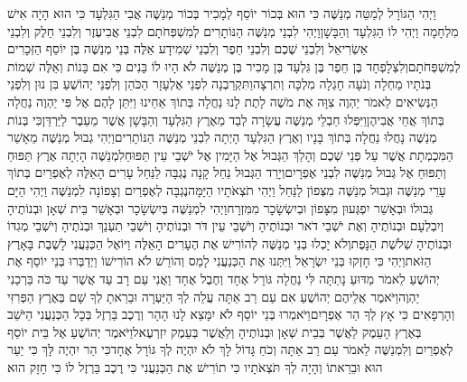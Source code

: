 \documentclass[../main/main.tex]{subfiles}
\begin{document}
\begin{multicols*}{\ncols}
וַיְהִי הַגּוֹרָל לְמַטֵּה מְנַשֶּׁה כִּי הוּא בְּכוֹר יוֹסֵף לְמָכִיר בְּכוֹר מְנַשֶּׁה אֲבִי הַגִּלְעָד כִּי הוּא הָיָה אִישׁ מִלְחָמָה וַיְהִי לוֹ הַגִּלְעָד וְהַבָּשָׁן\PreVerseSpace{}וַיְהִי לִבְנֵי מְנַשֶּׁה הַנּוֹתָרִים לְמִשְׁפְּחֹתָם לִבְנֵי אֲבִיעֶזֶר וְלִבְנֵי חֵלֶק וְלִבְנֵי אַשְׂרִיאֵל וְלִבְנֵי שֶׁכֶם וְלִבְנֵי חֵפֶר וְלִבְנֵי שְׁמִידָע אֵלֶּה בְּנֵי מְנַשֶּׁה בֶּן יוֹסֵף הַזְּכָרִים לְמִשְׁפְּחֹתָם\PreVerseSpace{}וְלִצְלָפְחָד בֶּן חֵפֶר בֶּן גִּלְעָד בֶּן מָכִיר בֶּן מְנַשֶּׁה לֹא הָיוּ לוֹ בָּנִים כִּי אִם בָּנוֹת וְאֵלֶּה שְׁמוֹת בְּנֹתָיו מַחְלָה וְנֹעָה חָגְלָה מִלְכָּה וְתִרְצָה\PreVerseSpace{}וַתִּקְרַבְנָה לִפְנֵי אֶלְעָזָר הַכֹּהֵן וְלִפְנֵי יְהוֹשֻׁעַ בִּן נוּן וְלִפְנֵי הַנְּשִׂיאִים לֵאמֹר יַהְוֶה צִוָּה אֶת מֹשֶׁה לָתֶת לָנוּ נַחֲלָה בְּתוֹךְ אַחֵינוּ וַיִּתֵּן לָהֶם אֶל פִּי יַהְוֶה נַחֲלָה בְּתוֹךְ אֲחֵי אֲבִיהֶן\PreVerseSpace{}וַיִּפְּלוּ חַבְלֵי מְנַשֶּׁה עֲשָׂרָה לְבַד מֵאֶרֶץ הַגִּלְעָד וְהַבָּשָׁן אֲשֶׁר מֵעֵבֶר לַיַּרְדֵּן\PreVerseSpace{}כִּי בְּנוֹת מְנַשֶּׁה נָחֲלוּ נַחֲלָה בְּתוֹךְ בָּנָיו וְאֶרֶץ הַגִּלְעָד הָיְתָה לִבְנֵי מְנַשֶּׁה הַנּוֹתָרִים\PreVerseSpace{}וַיְהִי גְבוּל מְנַשֶּׁה מֵאָשֵׁר הַמִּכְמְתָת אֲשֶׁר עַל פְּנֵי שְׁכֶם וְהָלַךְ הַגְּבוּל אֶל הַיָּמִין אֶל יֹשְׁבֵי עֵין תַּפּוּחַ\PreVerseSpace{}לִמְנַשֶּׁה הָיְתָה אֶרֶץ תַּפּוּחַ וְתַפּוּחַ אֶל גְּבוּל מְנַשֶּׁה לִבְנֵי אֶפְרָיִם\PreVerseSpace{}וְיָרַד הַגְּבוּל נַחַל קָנָה נֶגְבָּה לַנַּחַל עָרִים הָאֵלֶּה לְאֶפְרַיִם בְּתוֹךְ עָרֵי מְנַשֶּׁה וּגְבוּל מְנַשֶּׁה מִצְּפוֹן לַנַּחַל וַיְהִי תֹצְאֹתָיו הַיָּמָּה\PreVerseSpace{}נֶגְבָּה לְאֶפְרַיִם וְצָפוֹנָה לִמְנַשֶּׁה וַיְהִי הַיָּם גְּבוּלוֹ וּבְאָשֵׁר יִפְגְּעוּן מִצָּפוֹן וּבְיִשְׂשָׂכָר מִמִּזְרָח\PreVerseSpace{}וַיְהִי לִמְנַשֶּׁה בְּיִשְׂשָׂכָר וּבְאָשֵׁר בֵּית שְׁאָן וּבְנוֹתֶיהָ וְיִבְלְעָם וּבְנוֹתֶיהָ וְאֶת יֹשְׁבֵי דֹאר וּבְנוֹתֶיהָ וְיֹשְׁבֵי עֵין דֹּר וּבְנוֹתֶיהָ וְיֹשְׁבֵי תַעְנַךְ וּבְנֹתֶיהָ וְיֹשְׁבֵי מְגִדּוֹ וּבְנוֹתֶיהָ שְׁלֹשֶׁת הַנָּפֶת\PreVerseSpace{}וְלֹא יָכְלוּ בְּנֵי מְנַשֶּׁה לְהוֹרִישׁ אֶת הֶעָרִים הָאֵלֶּה וַיּוֹאֶל הַכְּנַעֲנִי לָשֶׁבֶת בָּאָרֶץ הַזֹּאת\PreVerseSpace{}וַיְהִי כִּי חָזְקוּ בְּנֵי יִשְׂרָאֵל וַיִּתְּנוּ אֶת הַכְּנַעֲנִי לָמַס וְהוֹרֵשׁ לֹא הוֹרִישׁוֹ \ClosedSection{}וַיְדַבְּרוּ בְּנֵי יוֹסֵף אֶת יְהוֹשֻׁעַ לֵאמֹר מַדּוּעַ נָתַתָּה לִּי נַחֲלָה גּוֹרָל אֶחָד וְחֶבֶל אֶחָד וַאֲנִי עַם רָב עַד אֲשֶׁר עַד כֹּה בֵּרְכַנִי יַהְוֶה\PreVerseSpace{}וַיֹּאמֶר אֲלֵיהֶם יְהוֹשֻׁעַ אִם עַם רַב אַתָּה עֲלֵה לְךָ הַיַּעְרָה וּבֵרֵאתָ לְךָ שָׁם בְּאֶרֶץ הַפְּרִזִּי וְהָרְפָאִים כִּי אָץ לְךָ הַר אֶפְרָיִם\PreVerseSpace{}וַיֹּאמְרוּ בְּנֵי יוֹסֵף לֹא יִמָּצֵא לָנוּ הָהָר וְרֶכֶב בַּרְזֶל בְּכָל הַכְּנַעֲנִי הַיֹּשֵׁב בְּאֶרֶץ הָעֵמֶק לַאֲשֶׁר בְּבֵית שְׁאָן וּבְנוֹתֶיהָ וְלַאֲשֶׁר בְּעֵמֶק יִזְרְעֶאל\PreVerseSpace{}וַיֹּאמֶר יְהוֹשֻׁעַ אֶל בֵּית יוֹסֵף לְאֶפְרַיִם וְלִמְנַשֶּׁה לֵאמֹר עַם רַב אַתָּה וְכֹחַ גָּדוֹל לָךְ לֹא יִהְיֶה לְךָ גּוֹרָל אֶחָד\PreVerseSpace{}כִּי הַר יִהְיֶה לָּךְ כִּי יַעַר הוּא וּבֵרֵאתוֹ וְהָיָה לְךָ תֹּצְאֹתָיו כִּי תוֹרִישׁ אֶת הַכְּנַעֲנִי כִּי רֶכֶב בַּרְזֶל לוֹ כִּי חָזָק הוּא\OpenSection{}\par

\end{multicols*}
\end{document}
